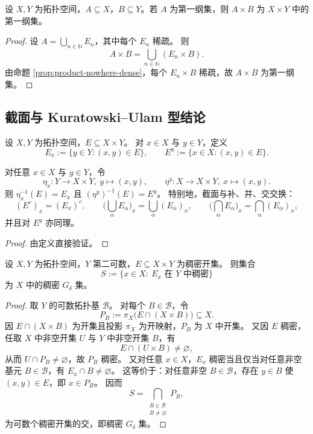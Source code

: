 \documentclass[lang=cn,a4paper,newtx,figureplace=section,tableplace=section]{elegantbook}
\begin{document}
\begin{proposition}\label{prop:product-meager}
  设 $X,Y$ 为拓扑空间，$A\subseteq X$，$B\subseteq Y$。若 $A$ 为第一纲集，则 $A\times B$ 为 $X\times Y$ 中的第一纲集。
\end{proposition}
\begin{proof}
  设 $A=\bigcup_{n\in\mathbb N}E_n$，其中每个 $E_n$ 稀疏。
  则
  \[
    A\times B=\bigcup_{n\in\mathbb N}(E_n\times B).
  \]
  由命题 \ref{prop:product-nowhere-dense}，每个 $E_n\times B$ 稀疏，故 $A\times B$ 为第一纲集。
\end{proof}

\subsection{截面与 Kuratowski--Ulam 型结论}

\begin{definition}[截面]\label{def:sections}
  设 $X,Y$ 为拓扑空间，$E\subseteq X\times Y$。
  对 $x\in X$ 与 $y\in Y$，定义
  \[
    E_x:=\{y\in Y:(x,y)\in E\},\qquad E^y:=\{x\in X:(x,y)\in E\}.
  \]
\end{definition}

\begin{proposition}\label{prop:section-preimage}
  对任意 $x\in X$ 与 $y\in Y$，令
  \[
    \eta_x:Y\to X\times Y,\ y\mapsto (x,y),\qquad \eta^y:X\to X\times Y,\ x\mapsto (x,y).
  \]
  则 $\eta_x^{-1}(E)=E_x$ 且 $(\eta^y)^{-1}(E)=E^y$。
  特别地，截面与补、并、交交换：
  \[
    (E^c)_x=(E_x)^c,\qquad \Big(\bigcup_\alpha E_\alpha\Big)_x=\bigcup_\alpha (E_\alpha)_x,\qquad \Big(\bigcap_\alpha E_\alpha\Big)_x=\bigcap_\alpha (E_\alpha)_x,
  \]
  并且对 $E^y$ 亦同理。
\end{proposition}
\begin{proof}
  由定义直接验证。
\end{proof}

\begin{lemma}\label{lem:dense-sections-Gdelta}
  设 $X,Y$ 为拓扑空间，$Y$ 第二可数，$E\subseteq X\times Y$ 为稠密开集。
  则集合
  \[
    S:=\{x\in X:\ E_x\text{ 在 }Y\text{ 中稠密}\}
  \]
  为 $X$ 中的稠密 $G_\delta$ 集。
\end{lemma}
\begin{proof}
  取 $Y$ 的可数拓扑基 $\mathcal B$。
  对每个 $B\in\mathcal B$，令
  \[
    P_B:=\pi_X\big(E\cap(X\times B)\big)\subseteq X.
  \]
  因 $E\cap(X\times B)$ 为开集且投影 $\pi_X$ 为开映射，$P_B$ 为 $X$ 中开集。
  又因 $E$ 稠密，任取 $X$ 中非空开集 $U$ 与 $Y$ 中非空开集 $B$，有
  \[
    E\cap(U\times B)\neq\varnothing,
  \]
  从而 $U\cap P_B\neq\varnothing$，故 $P_B$ 稠密。
  又对任意 $x\in X$，$E_x$ 稠密当且仅当对任意非空基元 $B\in\mathcal B$，有 $E_x\cap B\neq\varnothing$。
  这等价于：对任意非空 $B\in\mathcal B$，存在 $y\in B$ 使 $(x,y)\in E$，即 $x\in P_B$。
  因而
  \[
    S=\bigcap_{\substack{B\in\mathcal B\\ B\neq\varnothing}} P_B,
  \]
  为可数个稠密开集的交，即稠密 $G_\delta$ 集。
\end{proof}
\end{document}
